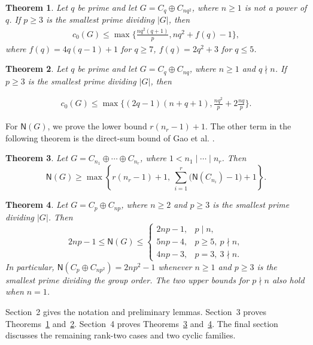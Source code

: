 \documentclass[10pt,a4paper]{amsart}
\newtheorem{thm}{Theorem} [section]
\theoremstyle{definition}
\theoremstyle{remark}
\numberwithin{equation}{section}
\begin{document}
\begin{thm}\label{thm5.1}
	Let $q$ be prime and let $G=C_q\oplus C_{nq^2}$, where $n\ge1$ is not a power of $q$. If $p\ge3$ is the smallest prime dividing $|G|$, then
	\begin{align*}
		c_0(G)\le \max \{\frac{nq^2(q+1)}{p},nq^2 +f(q) -1\},
	\end{align*}
	where $f(q)= 4q(q-1) +1$ for $q\ge 7$, $f(q)= 2q^2 +3$ for $q\le 5$.
\end{thm}

\begin{thm}\label{thm1.2}
	Let $q$ be prime and let $G=C_q\oplus C_{nq}$, where $n\ge1$ and $q\nmid n$. If $p\ge3$ is the smallest prime dividing $|G|$, then
	
	\begin{align*}
		c_0(G)\le \max \{(2q-1)(n+q+1),\frac{nq^2}{p} +2\frac{nq}{p}\}. 
	\end{align*}
	
\end{thm}

For $\mathsf N(G)$, we prove the lower bound $r(n_r-1)+1$.
The other term in the following theorem is the direct-sum bound of
Gao et al. \cite[Theorem~1.1(2)]{[GHHLYZ2022-2]}.

\begin{thm}\label{thm1.4}
Let $G=C_{n_1}\oplus\cdots\oplus C_{n_r}$, where
$1<n_1\mid\cdots\mid n_r$. Then
\[
\mathsf{N}(G)\ge
\max\left\{r(n_r-1)+1,\ \sum_{i=1}^r\bigl(\mathsf{N}(C_{n_i})-1\bigr)+1\right\}.
\]
\end{thm}


\begin{thm}\label{thm1.5}
Let $G=C_p\oplus C_{np}$, where $n\ge2$ and $p\ge3$ is the
smallest prime dividing $|G|$. Then
\[
 2np-1\le\mathsf N(G)\le
 \begin{cases}
 2np-1,&p\mid n,\\
 5np-4,&p\ge5,\ p\nmid n,\\
 4np-3,&p=3,\ 3\nmid n.
 \end{cases}
\]
In particular, $\mathsf N(C_p\oplus C_{np^2})=2np^2-1$
whenever $n\ge1$ and $p\ge3$ is the smallest prime dividing the group order.
The two upper bounds for $p\nmid n$ also hold when $n=1$.
\end{thm}


Section~2 gives the notation and preliminary lemmas.
Section~3 proves Theorems~\ref{thm5.1} and~\ref{thm1.2}.
Section~4 proves Theorems~\ref{thm1.4} and~\ref{thm1.5}.
The final section discusses the remaining rank-two cases and two cyclic families.
\end{document}
